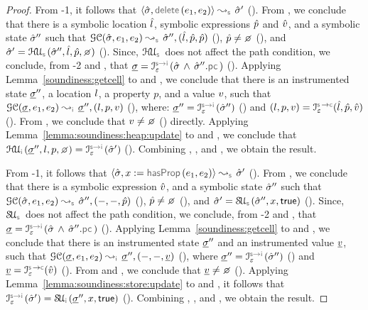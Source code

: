 \begin{proof}
\noindent {}
From \hyp{1}, it follows that $\absbsemrule{\sstate, \jsildelete(\jsilexpr_1, \jsilexpr_2)}{\sstate'}{\symbolic}$ (). 
From , we conclude that there is a symbolic location $\hat{l}$, symbolic expressions $\hat{p}$ and $\hat{v}$, and a symbolic state $\hat{\sigma}''$ such that 
$\absgetcellrule{\symbolic}{\sstate, \jsilexpr_1, \jsilexpr_2}{\sstate'', (\sloc, \sexprp, \sexprp)}$ (), 
$\sexprp \neq \none$ (), and  
$\sstate' = \hpupdt{\symbolic}(\sstate'', \sloc, \sexprp, \none)$ (). 
Since, $\hpupdt{\symbolic}$ does not affect the path condition, we conclude, from \hyp{2} and , that
$\istate = \interpret{\symbinst}{\senv}(\sstate \, \wedge \, \sstate''.\pcsel)$ (). 
Applying Lemma~\ref{soundiness:getcell} to  and , we conclude that
there is an instrumented state $\underline{\sigma}''$, a location $l$, a property $p$, and a value $v$, such that 
$\absgetcellrule{\instrumented}{\istate, \jsilexpr_1, \jsilexpr_2}{\istate'', (\loc, p, \val)}$ (), 
where: $\istate'' = \interpret{\symbinst}{\senv}(\sstate'')$ () and 
 $(\loc, p, \val) = \interpret{\symbconc}{\senv}(\sloc, \sexprp, \sexprv)$ (). 
From , we conclude that $\val \neq \none$ () directly. 
Applying Lemma~\ref{lemma:soundiness:heap:update} to  and , we conclude that 
$ \hpupdt{\instrumented}(\istate'', \loc, p, \none) = \interpret{\symbinst}{\senv}(\sstate')$ (). 
Combining , , and , we obtain the result. 
\vspace{5pt} 

\noindent {}
From \hyp{1}, it follows that $\absbsemrule{\sstate, \jvar := \hasfield(\jsilexpr_1, \jsilexpr_2)}{\sstate'}{\symbolic}$ (). 
From , we conclude that there is a symbolic expression $\hat{v}$, and a symbolic state $\hat{\sigma}''$ such that 
$\absgetcellrule{\symbolic}{\sstate, \jsilexpr_1, \jsilexpr_2}{\sstate'', (-, -, \sexprp)}$ (), $\sexprp \neq \none$ (), 
and $\sstate' = \stupdt{\symbolic}(\sstate'', \jvar, \jtrue)$ (). 
Since, $\stupdt{\symbolic}$ does not affect the path condition, we conclude, from \hyp{2} and , that
$\istate = \interpret{\symbinst}{\senv}(\sstate \, \wedge \, \sstate''.\pcsel)$ ().
Applying Lemma~\ref{soundiness:getcell} to  and , we conclude that
there is an instrumented state $\underline{\sigma}''$ and an instrumented value $\underline{v}$, such that 
$\absgetcellrule{\instrumented}{\istate, \jsilexpr_1, \jsilexpr_2}{\istate'', (-, -, \ival)}$ (), 
where $\istate'' = \interpret{\symbinst}{\senv}(\sstate'')$ () and $\ival = \interpret{\symbconc}{\senv}(\sexprv)$ (). 
From  and , we conclude that $\ival \neq \none$ (). 
Applying Lemma~\ref{lemma:soundiness:store:update} to  and , it follows
that  $\interpret{\symbinst}{\senv}(\sstate') = \stupdt{\instrumented}(\istate'', \jvar, \jtrue)$ ().
Combining , , and , we obtain the result. 
\vspace{5pt} 


\end{proof}
